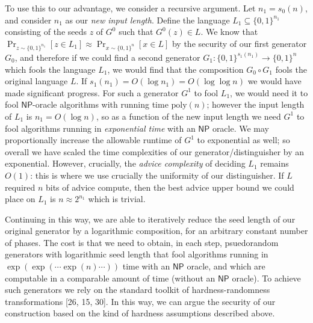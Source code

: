 To use this to our advantage, we consider a recursive argument. Let $n_{1}=s_{0}(n)$, and consider $n_{1}$ as our \emph{new input length}. Define the language $L_{1}\subseteq\{0,1\}^{n_{1}}$ consisting of the seeds $z$ of $G^{0}$ such that $G^{0}(z)\in L$. We know that $\Pr_{z\sim\{0,1\}^{n_{1}}}[z\in L_{1}]\approx\Pr_{x\sim\{0,1\}^{n}}[x\in L]$ by the security of our first generator $G_{0}$, and therefore if we could find a second generator $G_{1}:\{0,1\}^{s_{1}(n_{1})}\to\{0,1\}^{n}$ which fools the language $L_{1}$, we would find that the composition $G_{0}\circ G_{1}$ fools the original language $L$. If $s_{1}(n_{1})=O(\log n_{1})=O(\log\log n)$ we would have made significant progress. For such a generator $G^{1}$ to fool $L_{1}$, we would need it to fool ${\mathsf{NP}}$-oracle algorithms with running time $\mathrm{poly}(n)$; however the input length of $L_{1}$ is $n_{1}=O(\log n)$, so as a function of the new input length we need $G^{1}$ to fool algorithms running in \emph{exponential time} with an ${\mathsf{NP}}$ oracle. We may proportionally increase the allowable runtime of $G^{1}$ to exponential as well; so overall we have scaled the time complexities of our generator/distinguisher by an exponential. However, crucially, the \emph{advice complexity} of deciding $L_{1}$ remains $O(1)$: this is where we use crucially the uniformity of our distinguisher. If $L$ required $n$ bits of advice compute, then the best advice upper bound we could place on $L_{1}$ is $n\approx 2^{n_{1}}$ which is trivial.\par




Continuing in this way, we are able to iteratively reduce the seed length of our original generator by a logarithmic composition, for an arbitrary constant number of phases. The cost is that we need to obtain, in each step, psuedorandom generators with logarithmic seed length that fool algorithms running in $\exp(\exp(\cdots\exp(n)\cdots))$ time with an ${\mathsf{NP}}$ oracle, and which are computable in a comparable amount of time (without an ${\mathsf{NP}}$ oracle). To achieve such generators we rely on the standard toolkit of hardness-randomness transformations [26, 15, 30]. In this way, we can argue the security of our construction based on the kind of hardness assumptions described above.\par




